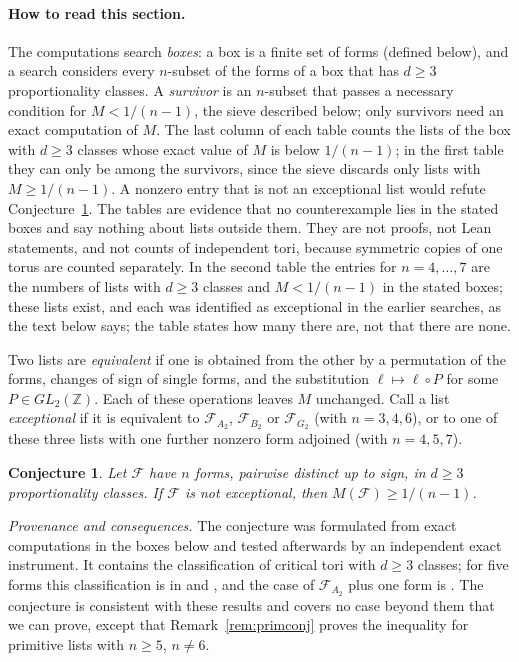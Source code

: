 \documentclass[11pt]{amsart}
\newtheorem{conjecture}[theorem]{Conjecture}
\theoremstyle{definition}
\theoremstyle{remark}
\newcommand{\Z}{\mathbb{Z}}
\begin{document}
\paragraph{How to read this section.} The computations search \emph{boxes}: a box is a finite set of forms (defined below), and a search considers every $n$-subset of the forms of a box that has $d\ge3$ proportionality classes. A \emph{survivor} is an $n$-subset that passes a necessary condition for $M<1/(n-1)$, the sieve described below; only survivors need an exact computation of $M$. The last column of each table counts the lists of the box with $d\ge3$ classes whose exact value of $M$ is below $1/(n-1)$; in the first table they can only be among the survivors, since the sieve discards only lists with $M\ge1/(n-1)$. A nonzero entry that is not an exceptional list would refute Conjecture~\ref{conj:gap}. The tables are evidence that no counterexample lies in the stated boxes and say nothing about lists outside them. They are not proofs, not Lean statements, and not counts of independent tori, because symmetric copies of one torus are counted separately. In the second table the entries for $n=4,\dots,7$ are the numbers of lists with $d\ge3$ classes and $M<1/(n-1)$ in the stated boxes; these lists exist, and each was identified as exceptional in the earlier searches, as the text below says; the table states how many there are, not that there are none.

Two lists are \emph{equivalent} if one is obtained from the other by a permutation of the forms, changes of sign of single forms, and the substitution $\ell\mapsto\ell\circ P$ for some $P\in GL_2(\Z)$. Each of these operations leaves $M$ unchanged. Call a list \emph{exceptional} if it is equivalent to $\mathcal F_{A_2}$, $\mathcal F_{B_2}$ or $\mathcal F_{G_2}$ (with $n=3,4,6$), or to one of these three lists with one further nonzero form adjoined (with $n=4,5,7$).

\begin{conjecture}\label{conj:gap}
Let $\mathcal F$ have $n$ forms, pairwise distinct up to sign, in $d\ge3$ proportionality classes. If $\mathcal F$ is not exceptional, then $M(\mathcal F)\ge1/(n-1)$.
\end{conjecture}

\emph{Provenance and consequences.} The conjecture was formulated from exact computations in the boxes below and tested afterwards by an independent exact instrument. It contains the classification of critical tori with $d\ge3$ classes; for five forms this classification is in \cite[Thm.~3.8]{Cordella} and \cite[Thm.~11.5]{YGB}, and the case of $\mathcal F_{A_2}$ plus one form is \cite[Lemma~9.4(iii), Thm.~9.6]{YGB}. The conjecture is consistent with these results and covers no case beyond them that we can prove, except that Remark~\ref{rem:primconj} proves the inequality for primitive lists with $n\ge5$, $n\ne6$.
\end{document}
